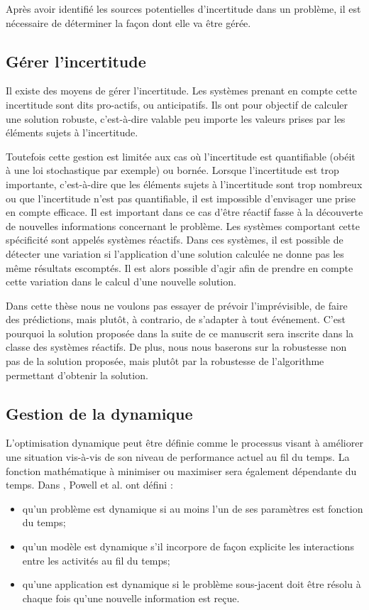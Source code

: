 Après avoir identifié les sources potentielles d'incertitude dans un problème, il est nécessaire de déterminer la façon dont elle va être gérée.
\subsection{Gérer l'incertitude}
 
Il existe des moyens de gérer l'incertitude. Les systèmes prenant en compte cette incertitude sont dits pro-actifs, ou anticipatifs. Ils ont pour objectif de calculer une solution robuste, c'est-à-dire valable peu importe les valeurs prises par les éléments sujets à l'incertitude.

Toutefois cette gestion est limitée aux cas où l'incertitude est quantifiable (obéit à une loi stochastique par exemple) ou bornée. Lorsque l'incertitude est trop importante, c'est-à-dire que les éléments sujets à l'incertitude sont trop nombreux ou que l'incertitude n'est pas quantifiable, il est impossible d'envisager une prise en compte efficace. Il est important dans ce cas d'être réactif fasse à la découverte de nouvelles informations concernant le problème. Les systèmes comportant cette spécificité sont appelés systèmes réactifs. Dans ces systèmes, il est possible de détecter une variation si l'application d'une solution calculée ne donne pas les même résultats escomptés. Il est alors possible d'agir afin de prendre en compte cette variation dans le calcul d'une nouvelle solution. 

Dans cette thèse nous ne voulons pas essayer de prévoir l'imprévisible, de faire des prédictions, mais plutôt, à contrario, de s'adapter à tout événement. C'est pourquoi la solution proposée dans la suite de ce manuscrit sera inscrite dans la classe des systèmes réactifs. De plus, nous nous baserons sur la robustesse non pas de la solution proposée, mais plutôt par la robustesse de l'algorithme permettant d'obtenir la solution.


\subsection{Gestion de la dynamique} \label{subsec:dynamique}
L'optimisation dynamique peut être définie comme le processus visant à améliorer une situation vis-à-vis de son niveau de performance actuel au fil du temps. La fonction mathématique à minimiser ou maximiser sera également dépendante du temps. Dans \cite{Powell1995}, Powell et al. ont défini : 
\begin{itemize}
 \item qu'un problème est dynamique si au moins l'un de ses paramètres est fonction du temps;
 \item qu'un modèle est dynamique s'il incorpore de façon explicite les interactions entre les activités au fil du temps;
 \item qu'une application est dynamique si le problème sous-jacent doit être résolu à chaque fois qu'une nouvelle information est reçue.\\
\end{itemize}


